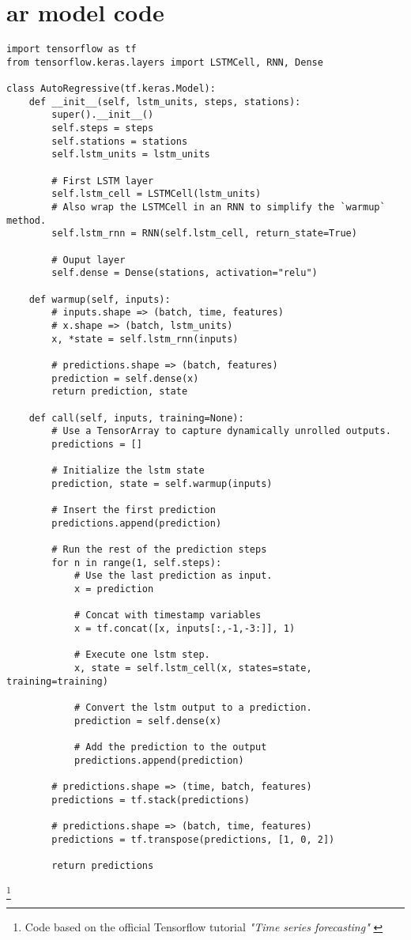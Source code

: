 \section{\acrlong{ar} model code}\label{app:ar}

\begin{verbatim}
import tensorflow as tf
from tensorflow.keras.layers import LSTMCell, RNN, Dense

class AutoRegressive(tf.keras.Model):
    def __init__(self, lstm_units, steps, stations):
        super().__init__()
        self.steps = steps
        self.stations = stations
        self.lstm_units = lstm_units
        
        # First LSTM layer
        self.lstm_cell = LSTMCell(lstm_units)
        # Also wrap the LSTMCell in an RNN to simplify the `warmup` method.
        self.lstm_rnn = RNN(self.lstm_cell, return_state=True)
        
        # Ouput layer
        self.dense = Dense(stations, activation="relu")

    def warmup(self, inputs):
        # inputs.shape => (batch, time, features)
        # x.shape => (batch, lstm_units)
        x, *state = self.lstm_rnn(inputs)

        # predictions.shape => (batch, features)
        prediction = self.dense(x)
        return prediction, state

    def call(self, inputs, training=None):
        # Use a TensorArray to capture dynamically unrolled outputs.
        predictions = []

        # Initialize the lstm state
        prediction, state = self.warmup(inputs)

        # Insert the first prediction
        predictions.append(prediction)

        # Run the rest of the prediction steps
        for n in range(1, self.steps):
            # Use the last prediction as input.
            x = prediction
            
            # Concat with timestamp variables
            x = tf.concat([x, inputs[:,-1,-3:]], 1)
            
            # Execute one lstm step.
            x, state = self.lstm_cell(x, states=state, training=training)
                                      
            # Convert the lstm output to a prediction.
            prediction = self.dense(x)
            
            # Add the prediction to the output
            predictions.append(prediction)

        # predictions.shape => (time, batch, features)
        predictions = tf.stack(predictions)
        
        # predictions.shape => (batch, time, features)
        predictions = tf.transpose(predictions, [1, 0, 2])
        
        return predictions
\end{verbatim}

\footnote{Code based on the official Tensorflow tutorial \textit{"Time series forecasting"} \cite{tensorflow2015-whitepaper}}